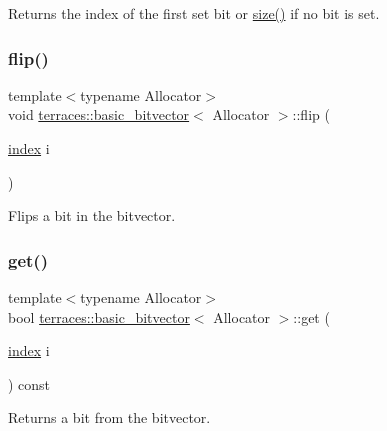 Returns the index of the first set bit or \hyperlink{classterraces_1_1basic__bitvector_a7a846347ea4c1c1f542ff3331307fdb9}{size()} if no bit is set. \mbox{\label{classterraces_1_1basic__bitvector_ad8f5d3222a2294e462f235ecd9dcb884}} 
\subsubsection{\texorpdfstring{flip()}{flip()}}
{\footnotesize\ttfamily template$<$typename Allocator$>$ \\
void \hyperlink{classterraces_1_1basic__bitvector}{terraces\+::basic\+\_\+bitvector}$<$ Allocator $>$\+::flip (\begin{DoxyParamCaption}\item[{\hyperlink{namespaceterraces_adbc33ccb543d1634e96d0eb02e472c77}{index}}]{i }\end{DoxyParamCaption})\hspace{0.3cm}{\ttfamily [inline]}}

Flips a bit in the bitvector. \mbox{\label{classterraces_1_1basic__bitvector_a13da8f2c63010742d71c351cababc2d3}} 
\subsubsection{\texorpdfstring{get()}{get()}}
{\footnotesize\ttfamily template$<$typename Allocator$>$ \\
bool \hyperlink{classterraces_1_1basic__bitvector}{terraces\+::basic\+\_\+bitvector}$<$ Allocator $>$\+::get (\begin{DoxyParamCaption}\item[{\hyperlink{namespaceterraces_adbc33ccb543d1634e96d0eb02e472c77}{index}}]{i }\end{DoxyParamCaption}) const\hspace{0.3cm}{\ttfamily [inline]}}

Returns a bit from the bitvector. \mbox{\label{classterraces_1_1basic__bitvector_a50cd443a48618a59a130b0325e75eac4}} 
